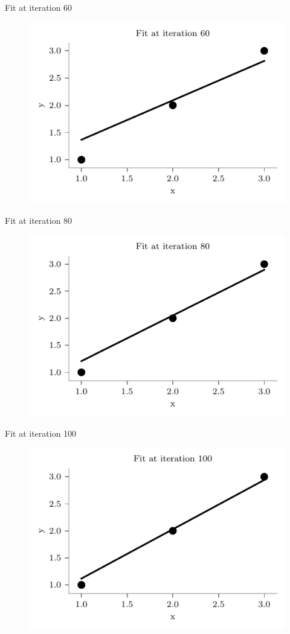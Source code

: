 \documentclass{beamer}
\begin{document}
	
\begin{frame}{Fit at iteration 60}
\begin{figure}
	\centering
	\includegraphics[width=0.7\linewidth]{fit-iteration-60.pdf}
\end{figure}
\end{frame}

\begin{frame}{Fit at iteration 80}
\begin{figure}
	\centering
	\includegraphics[width=0.7\linewidth]{fit-iteration-80.pdf}
\end{figure}\end{frame}

\begin{frame}{Fit at iteration 100}
\begin{figure}
	\centering
	\includegraphics[width=0.7\linewidth]{fit-iteration-100.pdf}
\end{figure}
\end{frame}
\end{document}
